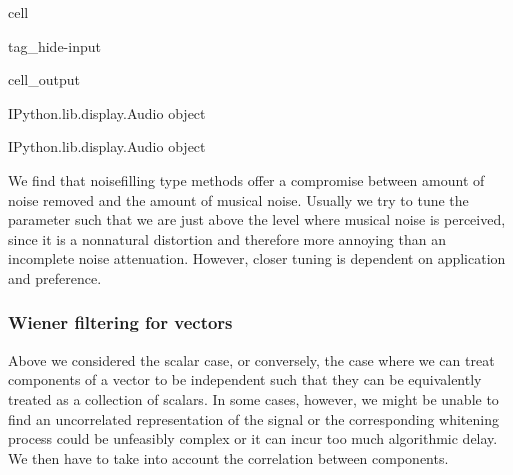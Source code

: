 \documentclass[letterpaper,10pt,english]{jupyterBook}
\begin{document}
\begin{sphinxuseclass}{cell}
\begin{sphinxuseclass}{tag_hide-input}\begin{sphinxVerbatimOutput}

\begin{sphinxuseclass}{cell_output}
\begin{sphinxVerbatim}[commandchars=\\\{\}]
\PYGZlt{}IPython.lib.display.Audio object\PYGZgt{}
\end{sphinxVerbatim}

\noindent{}

\begin{sphinxVerbatim}[commandchars=\\\{\}]
\PYGZlt{}IPython.lib.display.Audio object\PYGZgt{}
\end{sphinxVerbatim}

\end{sphinxuseclass}\end{sphinxVerbatimOutput}

\end{sphinxuseclass}
\end{sphinxuseclass}
\sphinxAtStartPar
We find that noisefilling \sphinxhyphen{}type methods offer a compromise between amount of noise removed and the amount of musical noise. Usually we try to tune the parameter such that we are just above the level where musical noise is perceived, since it is a non\sphinxhyphen{}natural distortion and therefore more annoying than an incomplete noise attenuation. However, closer tuning is dependent on application and preference.


\subsubsection{Wiener filtering for vectors}
\label{\detokenize{Enhancement/Noise_attenuation:wiener-filtering-for-vectors}}
\sphinxAtStartPar
Above we considered the scalar case, or conversely, the case where we
can treat components of a vector to be independent such that they can be
equivalently treated as a collection of scalars. In some cases, however,
we might be unable to find an uncorrelated representation of the signal
or the corresponding whitening process could be unfeasibly complex or it
can incur too much algorithmic delay. We then have to take into account
the correlation between components.
\end{document}
